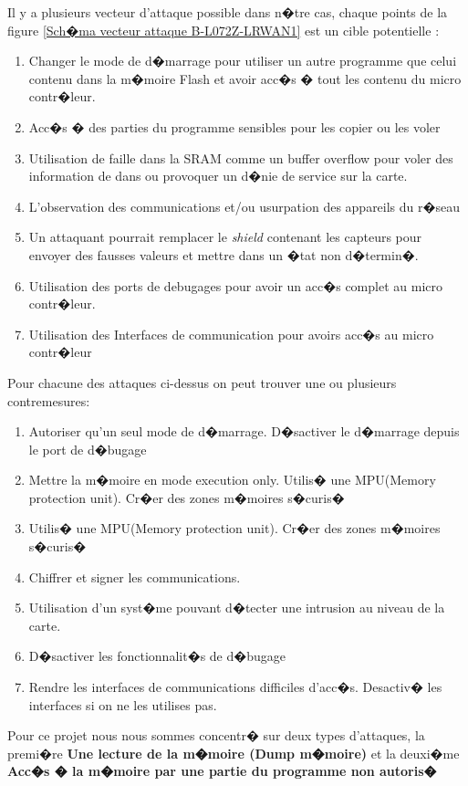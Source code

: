 \documentclass[a4paper, titlepage,12pt]{report}
\begin{document}
Il y a plusieurs vecteur d'attaque possible dans n�tre cas, chaque points de la figure \ref{Sch�ma vecteur attaque B-L072Z-LRWAN1} est un cible potentielle :

\begin{enumerate}
\item Changer le mode de d�marrage pour utiliser un autre programme que celui contenu dans la m�moire Flash et avoir acc�s � tout les contenu du micro contr�leur.
\item Acc�s � des parties du programme sensibles pour les copier ou les voler
\item Utilisation de faille dans la SRAM comme un buffer overflow pour voler des information de dans ou provoquer un d�nie de service sur la carte.
\item L'observation des communications et/ou usurpation des appareils du r�seau
\item Un attaquant pourrait remplacer le \textit{shield} contenant les capteurs pour envoyer des fausses valeurs et mettre dans un �tat non d�termin�.
\item Utilisation des ports de debugages pour avoir un acc�s complet au micro contr�leur.
\item Utilisation des Interfaces de communication pour avoirs acc�s au micro contr�leur
\end{enumerate}

Pour chacune des attaques ci-dessus on peut trouver une ou plusieurs contremesures:
\begin{enumerate}
\item Autoriser qu'un seul mode de d�marrage. D�sactiver le d�marrage depuis le port de d�bugage
\item Mettre la m�moire en mode execution only. Utilis� une MPU(Memory protection unit). Cr�er des zones m�moires s�curis�
\item Utilis� une MPU(Memory protection unit). Cr�er des zones m�moires s�curis�
\item Chiffrer et signer les communications.
\item Utilisation d'un syst�me pouvant d�tecter une intrusion au niveau de la carte.
\item D�sactiver les fonctionnalit�s de d�bugage
\item Rendre les interfaces de communications difficiles d'acc�s. Desactiv� les interfaces si on ne les utilises pas.
\end{enumerate}

Pour ce projet nous nous sommes concentr� sur deux types d'attaques, la premi�re \textbf{Une lecture de la m�moire (Dump m�moire)} et la deuxi�me \textbf{Acc�s � la m�moire par une partie du programme non autoris�}
\end{document}
